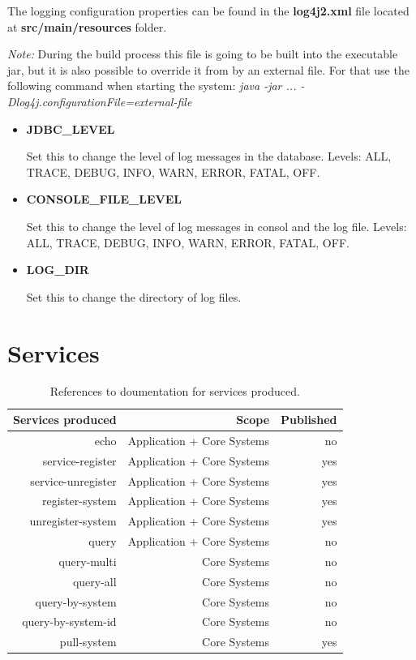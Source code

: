 \documentclass[a4paper]{arrowhead}
\begin{document}
The logging configuration properties can be found in the \textbf{log4j2.xml} file located at \textbf{src/main/resources} folder.

\textit{Note:} During the build process this file is going to be built into the executable jar, but it is also possible to override it from by an external file. For that use the following command when starting the system: \textit{java -jar ... -Dlog4j.configurationFile={external-file}}

\begin{itemize}
    \item \textbf{JDBC\_LEVEL}
    
    Set this to change the level of log messages in the database. Levels: ALL, TRACE, DEBUG, INFO, WARN, ERROR, FATAL, OFF.
    
    \item \textbf{CONSOLE\_FILE\_LEVEL}
    
    Set this to change the level of log messages in consol and the log file. Levels: ALL, TRACE, DEBUG, INFO, WARN, ERROR, FATAL, OFF.
    
    \item \textbf{LOG\_DIR}
    
    Set this to change the directory of log files.
\end{itemize}
  
\newpage

\section{Services}
\label{sec:services}

\begin{table}[ht!]
  \centering
  \caption{References to doumentation for services produced. }
  \label{tab:services}
  \begin{tabular}{|r|r|r|}
    \hline
    \rowcolor{gray!33}\textbf{Services produced} & \textbf{Scope} & \textbf{Published} \\
    \hline
 
    echo & Application + Core Systems & no \\ \hline
    service-register & Application + Core Systems & yes\\ \hline
    service-unregister & Application + Core Systems & yes\\ \hline
    register-system & Application + Core Systems & yes\\ \hline
    unregister-system & Application + Core Systems & yes\\ \hline
    query & Application + Core Systems & no\\ \hline
    query-multi & Core Systems & no\\ \hline
    query-all & Core Systems & no\\ \hline
    query-by-system & Core Systems & no\\ \hline
    query-by-system-id & Core Systems & no\\ \hline
    pull-system & Core Systems & yes\\ \hline
  \end{tabular}
\end{table}
\end{document}
